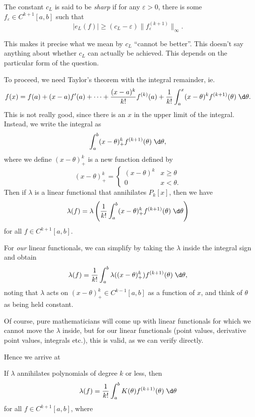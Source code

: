 \documentclass[a4paper]{article}
\begin{document}
\begin{defi}
  The constant $c_L$ is said to be \emph{sharp} if for any $\varepsilon > 0$, there is some $f_{\varepsilon} \in C^{k + 1}[a, b]$ such that
  \[
    |e_L(f)| \geq (c_L - \varepsilon)\|f^{(k + 1)}_\varepsilon\|_{\infty}.
  \]
\end{defi}

This makes it precise what we mean by $c_L$ ``cannot be better''. This doesn't say anything about whether $c_L$ can actually be achieved. This depends on the particular form of the question.

To proceed, we need Taylor's theorem with the integral remainder, ie.
\[
  f(x) = f(a) + (x - a) f'(a) + \cdots + \frac{(x - a)^k}{k!} f^{(k)}(a) + \frac{1}{k!}\int_a^x (x - \theta)^k f^{(k + 1)}(\theta)\;\d \theta.
\]
This is not really good, since there is an $x$ in the upper limit of the integral. Instead, we write the integral as
\[
  \int_a^b (x - \theta)^k_{+} f^{(k + 1)}(\theta)\;\d \theta,
\]
where we define $(x - \theta)^k_+$ is a new function defined by
\[
  (x - \theta)^k_+ =
  \begin{cases}
    (x - \theta)^k &x \geq \theta\\
    0 & x < \theta.
  \end{cases}
\]
Then if $\lambda$ is a linear functional that annihilates $P_k[x]$, then we have
\[
  \lambda(f) = \lambda\left(\frac{1}{k!}\int_a^b (x - \theta)^k_+ f^{(k + 1)}(\theta)\;\d \theta\right)
\]
for all $f \in C^{k + 1}[a, b]$.

For \emph{our} linear functionals, we can simplify by taking the $\lambda$ inside the integral sign and obtain
\[
  \lambda(f) = \frac{1}{k!} \int_a^b \lambda((x - \theta)_+^k) f^{(k + 1)}(\theta)\;\d \theta,
\]
noting that $\lambda$ acts on $(x - \theta)_{+}^k \in C^{k - 1}[a, b]$ as a function of $x$, and think of $\theta$ as being held constant.

Of course, pure mathematicians will come up with linear functionals for which we cannot move the $\lambda$ inside, but for our linear functionals (point values, derivative point values, integrals etc.), this is valid, as we can verify directly.

Hence we arrive at
\begin{thm}
  If $\lambda$ annihilates polynomials of degree $k$ or less, then
  \[
    \lambda(f) = \frac{1}{k!} \int_a^b K(\theta) f^{(k + 1)}(\theta) \;\d \theta
  \]
  for all $f \in C^{k + 1}[a, b]$, where
\end{thm}
\end{document}
